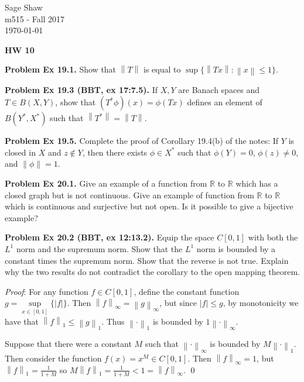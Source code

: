 \documentclass[12pt]{article}
\newcommand{\problem}[1]{\hspace{-4 ex} \large \textbf{Problem #1} }
\newcommand{\norm}[1]{\left\lVert#1\right\rVert}
\renewenvironment{proof}{\hspace{-4 ex} \emph{Proof}:}{\qed}
\newcommand{\RR}{\mathbb{R}}
\begin{document}
	\thispagestyle{empty}
	
	\begin{flushright}
		Sage Shaw \\
		m515 - Fall 2017 \\
		\today
	\end{flushright}
	
{\large \textbf{HW 10}}\bigbreak

\problem{Ex 19.1.} Show that $\norm{T}$ is equal to $\sup\{\norm{Tx}:\norm{x}\leq1\}$. \bigbreak


\bigbreak
\problem{Ex 19.3 (BBT, ex 17:7.5).} If $X,Y$ are Banach spaces and $T\in B(X,Y)$, show that $(T^*\phi)(x)=\phi(Tx)$ defines an element of $B(Y^*,X^*)$ such that $\norm{T^*}=\norm{T}$. \bigbreak

\bigbreak
\problem{Ex 19.5.} Complete the proof of Corollary 19.4(b) of the notes: If $Y$ is closed in $X$ and $z\notin Y$, then there exists $\phi\in X^*$ such that $\phi(Y)=0$, $\phi(z)\neq0$, and $\norm{\phi}=1$. \bigbreak

\bigbreak
\problem{Ex 20.1.} Give an example of a function from $\RR$ to $\RR$ which has a closed graph but is not continuous. Give an example of function from $\RR$ to $\RR$ which is continuous and surjective but not open. Is it possible to give a bijective example? \bigbreak


\bigbreak
\problem{Ex 20.2 (BBT, ex 12:13.2).} Equip the space $C[0,1]$ with both the $L^1$ norm and the supremum norm. Show that the $L^1$ norm is bounded by a constant times the supremum norm. Show that the reverse is not true. Explain why the two results do not contradict the corollary to the open mapping theorem. \bigbreak

	\begin{proof}
		For any function $f \in C[0,1]$, define the constant function $g = \sup\limits_{x \in [0,1]}\{\vert f \vert \}$. Then $\norm{f}_\infty = \norm{g}_\infty$, but since $\vert f \vert  \leq g$, by monotonicity we have that $\norm{f}_1 \leq \norm{g}_1$. Thus $\norm{\cdot}_1$ is bounded by $1\norm{\cdot}_\infty$. \bigbreak
		
		Suppose that there were a constant $M$ such that $\norm{\cdot}_\infty$ is bounded by $M\norm{\cdot}_1$. Then consider the function $f(x) = x^{M} \in C[0,1]$. Then $\norm{f}_\infty = 1$, but $\norm{f}_1 = \tfrac{1}{1+M}$ so $M \norm{f}_1 = \tfrac{1}{1+M} < 1 = \norm{f}_\infty$.
	\end{proof}
	
\end{document}
